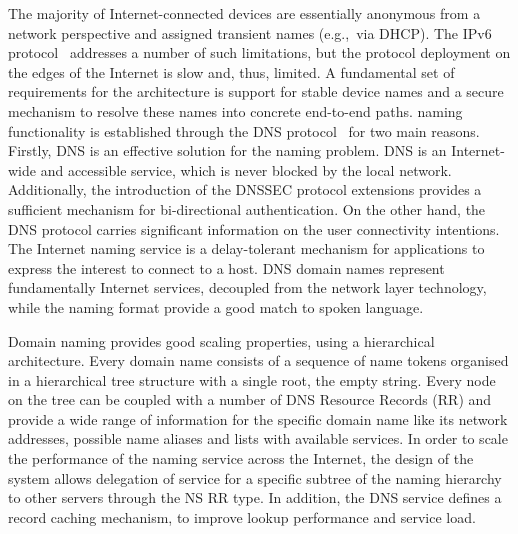 The majority of Internet-connected devices are essentially anonymous from a
network perspective and assigned transient names (e.g.,~via DHCP). The IPv6
protocol~\cite{RFC1883} addresses a number of such limitations, but the protocol
deployment on the edges of the Internet is slow and, thus, limited. A
fundamental set of requirements for the \signpost architecture is support for stable
device  names and a secure mechanism to resolve these names into
concrete end-to-end paths.  \signpost naming functionality is established
through the DNS protocol~\cite{RFC1034} for two main reasons.  Firstly, DNS is
an effective solution for the naming problem. DNS is an Internet-wide and
accessible service, which is never blocked by the local network. Additionally,
the introduction of the DNSSEC protocol extensions provides a sufficient
mechanism for bi-directional authentication.  On the other hand, the DNS
protocol carries significant information on the user connectivity intentions. 
The Internet naming service is a delay-tolerant mechanism for applications to
express the interest to connect to a host. DNS domain names represent
fundamentally Internet services, decoupled from the network layer technology,
while the naming format provide a good match to spoken language. 

Domain naming provides good scaling properties, using a hierarchical
architecture. Every domain name consists of a sequence of name tokens organised
in a hierarchical tree structure with a single root, the empty string. Every
node on the tree can be coupled with a number of DNS Resource Records (RR) and
provide a wide range of information for the specific domain name like its
network addresses, possible name aliases and lists with available services. In
order to scale the performance of the naming service across the Internet, the
design of the system allows delegation of service for a specific subtree of the
naming hierarchy to other servers through the NS RR type. 
In addition, the DNS service
defines a record caching mechanism, to improve lookup performance and service
load. 

